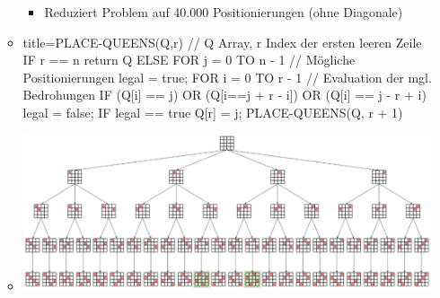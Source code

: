 \documentclass[
    12pt,
    a4paper,
    ngerman,
    color=3b,%
    marginpar=false,
    colorback=false,
    leqno,
]{tudaexercise}
\begin{document}
\begin{itemize}
\begin{itemize}
\begin{minipage}{0.6\textwidth}
\begin{itemize}
                            \item Reduziert Problem auf 40.000 Positionierungen (ohne Diagonale)
                        \end{itemize}
                    \end{minipage}
                \item[]
                    \begin{ccode}[autogobble]{title={PLACE-QUEENS(Q,r) // Q Array, r Index der ersten leeren Zeile}}
                    IF r == n
                        return Q
                    ELSE
                        FOR j = 0 TO n - 1 // Mögliche Positionierungen
                            legal = true;
                            FOR i = 0 TO r - 1  // Evaluation der mgl. Bedrohungen
                                IF (Q[i] == j) OR (Q[i==j + r - i]) OR (Q[i] == j - r + i)
                                    legal = false;
                            IF legal == true
                                Q[r] = j;
                                PLACE-QUEENS(Q, r + 1)
                    \end{ccode}
                        \item[] \includegraphics[width=16cm]{pictures/damenSuchbaum.PNG}
            \end{itemize}

    \end{itemize}

\pagebreak
\end{document}
